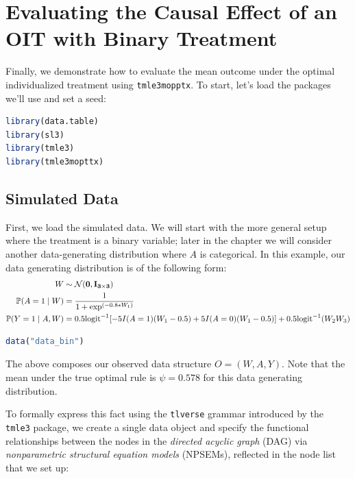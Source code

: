 \documentclass[12pt, krantz2,]{krantz}
\newcommand{\passthrough}[1]{#1}
\theoremstyle{definition}
\theoremstyle{definition}
\theoremstyle{definition}
\renewcommand{\P}{\mathbb{P}}
\newcommand{\1}{\mathbbm{1}}
\begin{document}
\hypertarget{oit-eval-bin}{%
\section{Evaluating the Causal Effect of an OIT with Binary Treatment}\label{oit-eval-bin}}

Finally, we demonstrate how to evaluate the mean outcome under the optimal
individualized treatment using \passthrough{\lstinline!tmle3mopptx!}. To start, let's load the packages
we'll use and set a seed:

\begin{lstlisting}[language=R]
library(data.table)
library(sl3)
library(tmle3)
library(tmle3mopttx)
\end{lstlisting}

\hypertarget{simulated-data}{%
\subsection{Simulated Data}\label{simulated-data}}

First, we load the simulated data. We will start with the more general setup
where the treatment is a binary variable; later in the chapter we will consider
another data-generating distribution where \(A\) is categorical. In this example,
our data generating distribution is of the following form:
\begin{align*}
  W &\sim \mathcal{N}(\bf{0},I_{3 \times 3})\\
  \P(A=1 \mid W) &= \frac{1}{1+\exp^{(-0.8*W_1)}}\\
  \P(Y=1 \mid A,W) &= 0.5\text{logit}^{-1}[-5I(A=1)(W_1-0.5)+5I(A=0)(W_1-0.5)] +
     0.5\text{logit}^{-1}(W_2W_3)
\end{align*}

\begin{lstlisting}[language=R]
data("data_bin")
\end{lstlisting}

The above composes our observed data structure \(O = (W, A, Y)\). Note that the
mean under the true optimal rule is \(\psi=0.578\) for this data generating
distribution.

To formally express this fact using the \passthrough{\lstinline!tlverse!} grammar introduced by the
\passthrough{\lstinline!tmle3!} package, we create a single data object and specify the functional
relationships between the nodes in the \emph{directed acyclic graph} (DAG) via
\emph{nonparametric structural equation models} (NPSEMs), reflected in the node list
that we set up:
\end{document}
